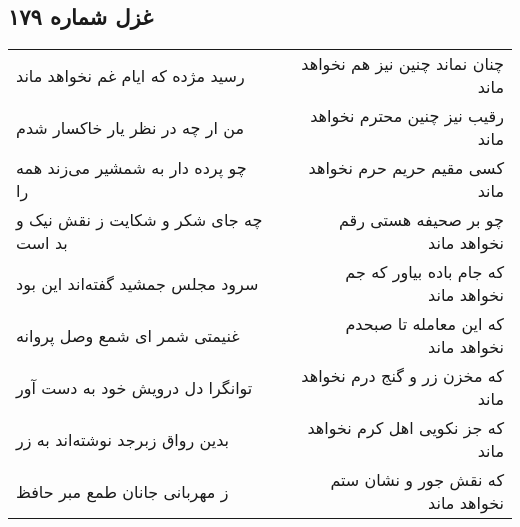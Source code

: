 \begin{center}
\section*{غزل شماره ۱۷۹}
\label{sec:sh179}
\begin{longtable}{l p{0.5cm} r}
رسید مژده که ایام غم نخواهد ماند
&&
چنان نماند چنین نیز هم نخواهد ماند
\\
من ار چه در نظر یار خاکسار شدم
&&
رقیب نیز چنین محترم نخواهد ماند
\\
چو پرده دار به شمشیر می‌زند همه را
&&
کسی مقیم حریم حرم نخواهد ماند
\\
چه جای شکر و شکایت ز نقش نیک و بد است
&&
چو بر صحیفه هستی رقم نخواهد ماند
\\
سرود مجلس جمشید گفته‌اند این بود
&&
که جام باده بیاور که جم نخواهد ماند
\\
غنیمتی شمر ای شمع وصل پروانه
&&
که این معامله تا صبحدم نخواهد ماند
\\
توانگرا دل درویش خود به دست آور
&&
که مخزن زر و گنج درم نخواهد ماند
\\
بدین رواق زبرجد نوشته‌اند به زر
&&
که جز نکویی اهل کرم نخواهد ماند
\\
ز مهربانی جانان طمع مبر حافظ
&&
که نقش جور و نشان ستم نخواهد ماند
\\
\end{longtable}
\end{center}

